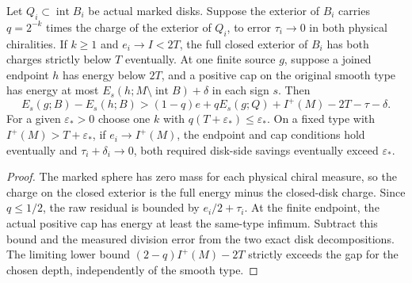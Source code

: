 \begin{proposition}
\label{prop:ed03-balanced-disk}
\leanok
Let $Q_i\subset\operatorname{int}B_i$ be actual marked disks.
Suppose the exterior of $B_i$ carries $q=2^{-k}$ times the charge
of the exterior of $Q_i$, to error $\tau_i\to0$ in both physical
chiralities. If $k\ge1$ and $e_i\to I<2T$, the full closed exterior
of $B_i$ has both charges strictly below $T$ eventually.
At one finite source $g$, suppose a joined endpoint $h$ has energy
below $2T$, and a positive cap on the original smooth type has
energy at most $E_s(h;M\setminus\operatorname{int}B)+\delta$ in
each sign $s$. Then
\[
 E_s(g;B)-E_s(h;B)>(1-q)e+qE_s(g;Q)+I^+(M)-2T-\tau-\delta .
\]
For a given $\varepsilon_*>0$ choose one $k$ with
$q(T+\varepsilon_*)\le\varepsilon_*$. On a fixed type with
$I^+(M)>T+\varepsilon_*$, if $e_i\to I^+(M)$, the endpoint and cap
conditions hold eventually and $\tau_i+\delta_i\to0$, both required
disk-side savings eventually exceed $\varepsilon_*$.
\end{proposition}
\begin{proof}
\leanok
The marked sphere has zero mass for each physical chiral measure,
so the charge on the closed exterior is the full energy minus the
closed-disk charge. Since $q\le1/2$, the raw residual is bounded
by $e_i/2+\tau_i$. At the finite endpoint, the actual positive cap
has energy at least the same-type infimum. Subtract this bound and
the measured division error from the two exact disk decompositions.
The limiting lower bound $(2-q)I^+(M)-2T$ strictly exceeds the gap
for the chosen depth, independently of the smooth type.
\end{proof}

